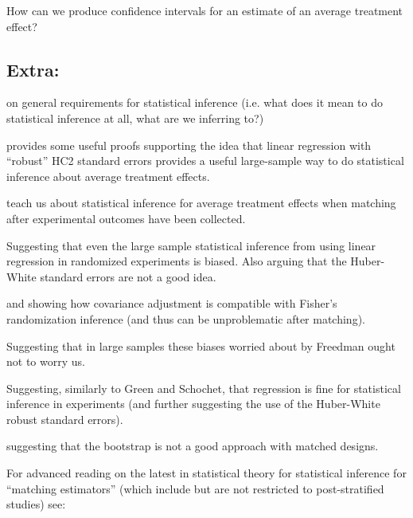 \documentclass[10pt, letterpaper]{article}
\begin{document}
\citealp[Chap 2]{rosenbaum2010design}

How can we produce  confidence intervals for an estimate of an average
treatment effect?

\citealp[Chap 6.1 and Appendix 6.1]{dunning2012natural}

\citealp[Chap 17]{imbens2009causal}

\subsection{Extra:}

\citealp[Chap 4]{berk04} on general requirements for statistical
inference (i.e. what does it mean to do statistical inference at all, what are
we inferring to?)


\cite{linlr:2011} provides some useful proofs supporting the idea
that linear regression with ``robust'' HC2 standard errors provides a
useful large-sample way to do statistical inference about average
treatment effects.

\cite{miratrix2012adjusting} teach us about statistical inference for average
treatment effects when matching after experimental outcomes have been
collected.

\cite{freedman2008randomization,freedman2008rae,freedman2007rae,Free:2006:On-t}
Suggesting that even the large sample statistical inference from using
linear regression in randomized experiments is biased. Also arguing
that the Huber-White standard errors are not a good idea.

\cite{rosenbaum:2002a} and \cite{bowers2011fish} showing how
covariance adjustment is compatible with Fisher's randomization
inference (and thus can be unproblematic after matching).

\cite{schochet2009regression,green2009ec} Suggesting that in large
samples these biases worried about by Freedman ought not to worry
us. 

\citealp[Chap 6--8]{imbens2009causal} Suggesting, similarly to Green and
Schochet, that regression is fine for statistical inference in
experiments (and further suggesting the use of the Huber-White robust
standard errors).

\citealp{AbadImbe:2004:On-t} suggesting that the bootstrap is not a good
approach with matched designs.

For advanced reading on the latest in statistical theory for
statistical inference for ``matching estimators'' (which include but
are not restricted to post-stratified studies) see:
\end{document}
